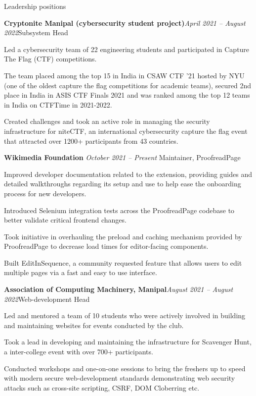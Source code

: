 \documentclass{resume} %
\begin{document}
\begin{rSection}{Leadership positions}
\begin{rSubsection}{\bf Cryptonite Manipal (cybersecurity student project)}{\em April 2021 -- August 2022}{Subsystem Head}{}
\item Led a cybersecurity team of 22 engineering students and participated in Capture The Flag (CTF) competitions. 
\item The team placed among the top 15 in India in CSAW CTF '21 hosted by NYU (one of the oldest capture the flag competitions for academic teams), secured 2nd place in India in ASIS CTF Finals 2021 and was ranked among the top 12 teams in India on CTFTime in 2021-2022.
\item Created challenges and took an active role in managing the security infrastructure for niteCTF, an international cybersecurity capture the flag event that attracted over 1200+ participants from 43 countries.
\end{rSubsection}
\begin{rSubsection}{ \bf Wikimedia Foundation}{ \em October 2021 -- Present }{Maintainer, ProofreadPage}{}
\item Improved developer documentation related to the extension, providing guides and detailed walkthroughs regarding its setup and use to help ease the onboarding process for new developers.
\item Introduced Selenium integration tests across the ProofreadPage codebase to better validate critical frontend changes.
\item Took initiative in overhauling the preload and caching mechanism provided by ProofreadPage to decrease load times for editor-facing components.
\item Built EditInSequence, a community requested feature that allows users to edit multiple pages via a fast and easy to use interface.
\end{rSubsection}
\begin{rSubsection}{\bf Association of Computing Machinery, Manipal}{\em August 2021 -- August 2022}{Web-development Head}{}
\item Led and mentored a team of 10 students who were actively involved in building and maintaining websites for events conducted by the club.
\item Took a lead in developing and maintaining the infrastructure for Scavenger Hunt, a inter-college event with over 700+ participants.
\item Conducted workshops and one-on-one sessions to bring the freshers up to speed with modern secure web-development standards demonstrating web security attacks such as cross-site scripting, CSRF, DOM Cloberring etc.

\end{rSubsection}
\end{rSection}
\end{document}
